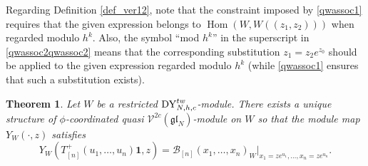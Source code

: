 \documentclass[12pt,a4paper,reqno]{amsart}
\theoremstyle{stil}
\newtheorem{thm}{Theorem}[section]
\theoremstyle{defi}
\theoremstyle{defi}
\theoremstyle{stil}
\theoremstyle{stil}
\theoremstyle{stil}
\theoremstyle{prim}
\newcommand{\beq}{\begin{equation}}
\newcommand{\eeq}{\end{equation}}
\newcommand{\om}{\mathop{\mathrm{Hom}}}
\newcommand{\dyho}{{\rm DY}_{N,h,c}^{tw}  }
\newcommand{\vac}{ \mathrm{\boldsymbol{1}}}
\newcommand{\Vc}{\mathcal{V}^{2c}(\mathfrak{gl}_N)}
\newcommand{\bc}{\mathcal{B}}
\begin{document}
 Regarding Definition \ref{def_ver12}, note that the constraint imposed by
\eqref{qwassoc1} requires that the given expression belongs to $\om (W,W((z_1,z_2)) )$ when regarded modulo $h^k$. Also, the symbol ``mod $h^k$'' in the superscript in \eqref{qwassoc2qwassoc2} means that the corresponding substitution $z_1=z_2e^{z_0}$ should be applied to the given expression regarded modulo $h^k$ (while \eqref{qwassoc1} ensures that such a substitution exists).
 
\begin{thm}\label{thm_33}
Let $W$ be a restricted $\dyho$-module.
There exists a unique structure of $\phi$-coordinated quasi $\Vc$-module on $W $ so that the module map $Y_{W}(\cdot , z)$ satisfies
\beq\label{modulemap}
Y_{W}(T_{[n]}^+(u_1,\ldots ,u_n)\vac , z)=
\bc_{[n]}(x_1, \ldots ,x_n )_W\big|_{x_1=ze^{u_1},\ldots ,x_n=ze^{u_n}}.
\eeq
\end{thm}
\end{document}
